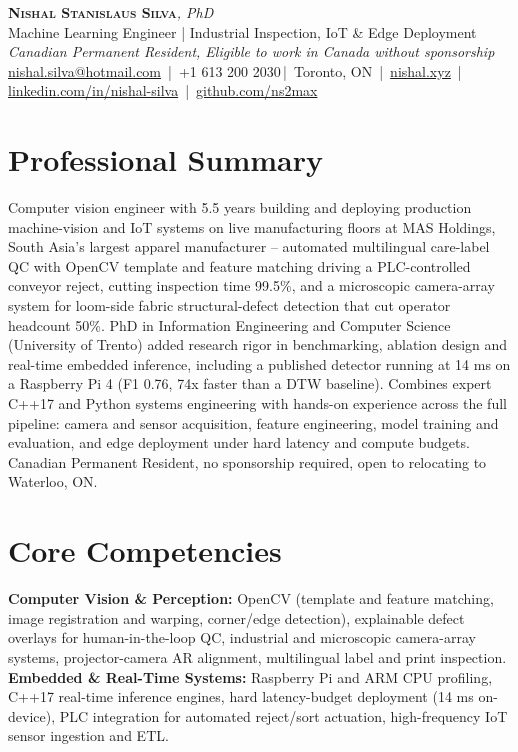\documentclass[11pt]{article}
\makeatletter
\newcommand{\cvName}{Nishal Stanislaus Silva}
\newcommand{\cvEmail}{nishal.silva@hotmail.com}
\newcommand{\cvPhone}{+1 613 200 2030}
\newcommand{\cvCity}{Toronto, ON}
\newcommand{\cvSite}{https://nishal.xyz}
\newcommand{\cvLinkedIn}{https://www.linkedin.com/in/nishal-silva}
\newcommand{\cvGitHub}{https://github.com/ns2max}
\newcommand{\cvStatus}{Canadian Permanent Resident, Eligible to work in Canada without sponsorship}
\newcommand{\cvTagline}{Machine Learning Engineer | Industrial Inspection, IoT \& Edge Deployment}
\makeatother
\begin{document}
\pagestyle{empty}
\begin{center}
    {\LARGE \scshape \textbf{\cvName}}{\large \textit{, PhD}}\\[1pt]
    {\small \cvTagline}\\[1pt]
    {\footnotesize\textit{\cvStatus}}\\[1pt]
    {\small
    \href{mailto:\cvEmail}{\cvEmail} \,|\, \cvPhone \,|\, \cvCity
    \,|\, \href{\cvSite}{nishal.xyz} \,|\, \href{\cvLinkedIn}{linkedin.com/in/nishal-silva}
    \,|\, \href{\cvGitHub}{github.com/ns2max}}
\end{center}

\section*{Professional Summary}
Computer vision engineer with 5.5 years building and deploying production machine-vision and IoT systems on live manufacturing floors at MAS Holdings, South Asia's largest apparel manufacturer -- automated multilingual care-label QC with OpenCV template and feature matching driving a PLC-controlled conveyor reject, cutting inspection time 99.5\%, and a microscopic camera-array system for loom-side fabric structural-defect detection that cut operator headcount 50\%. PhD in Information Engineering and Computer Science (University of Trento) added research rigor in benchmarking, ablation design and real-time embedded inference, including a published detector running at 14 ms on a Raspberry Pi 4 (F1 0.76, 74x faster than a DTW baseline). Combines expert C++17 and Python systems engineering with hands-on experience across the full pipeline: camera and sensor acquisition, feature engineering, model training and evaluation, and edge deployment under hard latency and compute budgets. Canadian Permanent Resident, no sponsorship required, open to relocating to Waterloo, ON.

\section*{Core Competencies}
\textbf{Computer Vision \& Perception:} OpenCV (template and feature matching, image registration and warping, corner/edge detection), explainable defect overlays for human-in-the-loop QC, industrial and microscopic camera-array systems, projector-camera AR alignment, multilingual label and print inspection. \\[2pt]
\textbf{Embedded \& Real-Time Systems:} Raspberry Pi and ARM CPU profiling, C++17 real-time inference engines, hard latency-budget deployment (14 ms on-device), PLC integration for automated reject/sort actuation, high-frequency IoT sensor ingestion and ETL.
\end{document}

